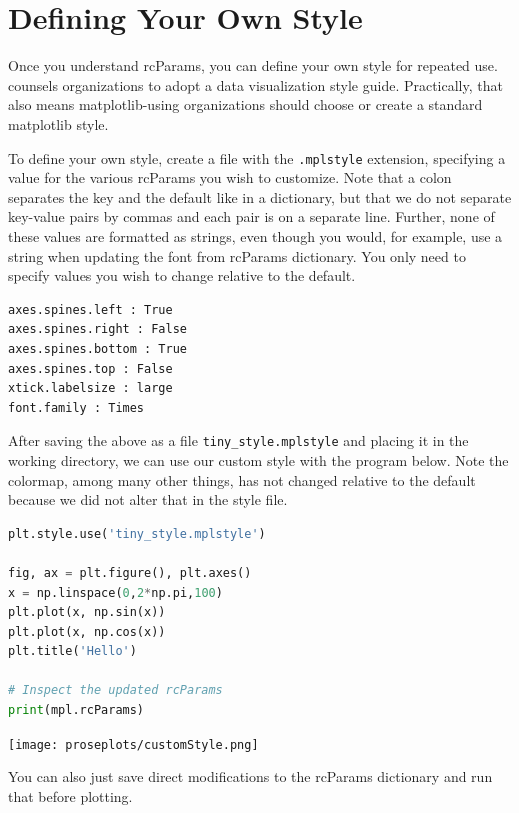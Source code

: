 \section{Defining Your Own Style}

Once you understand rcParams, you can define your own style for repeated use. \cite{schwabish2021better} counsels organizations to adopt a data visualization style guide. Practically, that also means matplotlib-using organizations should choose or create a standard matplotlib style. 

To define your own style, create a file with the \texttt{.mplstyle} extension, specifying a value for the various rcParams you wish to customize. Note that a colon separates the key and the default like in a dictionary, but that we do not separate key-value pairs by commas and each pair is on a separate line. Further, none of these values are formatted as strings, even though you would, for example, use a string  when updating the font from rcParams dictionary. You only need to specify values you wish to change relative to the default.

\begin{lstlisting}[caption = {[tiny\_style.mplstyle]}] %skip
axes.spines.left : True
axes.spines.right : False
axes.spines.bottom : True
axes.spines.top : False
xtick.labelsize : large
font.family : Times
\end{lstlisting}

After saving the above as a file \texttt{tiny\_style.mplstyle} and placing it in the working directory, we can use our custom style with the program below. Note the colormap, among many other things, has not changed relative to the default because we did not alter that in the style file. 

\begin{lstlisting}[language = Python]
plt.style.use('tiny_style.mplstyle')

fig, ax = plt.figure(), plt.axes()
x = np.linspace(0,2*np.pi,100)
plt.plot(x, np.sin(x))
plt.plot(x, np.cos(x))
plt.title('Hello')

# Inspect the updated rcParams
print(mpl.rcParams)
\end{lstlisting}

\begin{center}
    \texttt{[image: proseplots/customStyle.png]}
\end{center}

You can also just save direct modifications to the rcParams dictionary and run that before plotting. 

